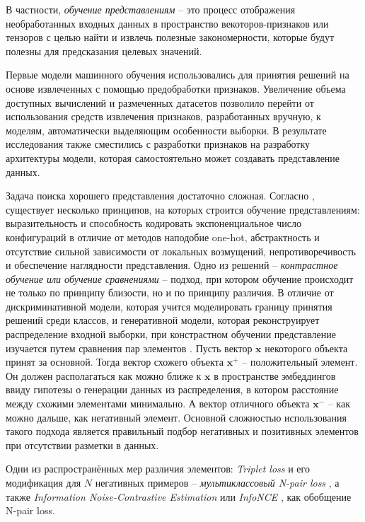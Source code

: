\documentclass[a4paper, 14pt]{article}
\begin{document}
В частности, \textit{обучение представлениям} -- это процесс отображения необработанных входных данных в пространство векоторов-признаков или тензоров с целью найти и извлечь полезные закономерности, которые будут полезны для предсказания целевых значений.

Первые модели машинного обучения использовались для принятия решений на основе извлеченных с помощью предобработки признаков. Увеличение объема доступных вычислений и размеченных датасетов позволило перейти от использования средств извлечения признаков, разработанных вручную, к моделям, автоматически выделяющим особенности выборки. В результате исследования также сместились с разработки признаков на разработку архитектуры модели, которая самостоятельно может создавать представление данных.

Задача поиска хорошего представления достаточно сложная. Согласно \citep{LeKhac2020}, существует несколько принципов, на которых строится обучение представлениям: выразительность и способность кодировать экспоненциальное число конфигураций в отличие от методов наподобие one-hot, абстрактность и отсутствие сильной зависимости от локальных возмущений, непротиворечивость и обеспечение наглядности представления. Одно из решений -- \textit{контрастное обучение или обучение сравнениями} -- подход, при котором обучение происходит не только по принципу близости, но и по принципу различия. В отличие от дискриминативной модели, которая учится моделировать границу принятия решений среди классов, и генеративной модели, которая реконструирует распределение входной выборки, при констрастном обучении представление изучается путем сравнения пар элементов \citep{Chopra}. Пусть вектор $\textbf{x}$ некоторого объекта принят за основной. Тогда вектор схожего объекта $\textbf{x}^+$ -- положительный элемент. Он должен располагаться как можно ближе к $\textbf{x}$ в пространстве эмбеддингов ввиду гипотезы о генерации данных из распределения, в котором расстояние между схожими элементами минимально. А вектор отличного объекта $\textbf{x}^-$ -- как можно дальше, как негативный элемент. Основной сложностью использования такого подхода является правильный подбор негативных и позитивных элементов при отсутствии разметки в данных.

Одни из распространённых мер различия элементов: \textit{Triplet loss} \citep{Schroff2015} и его модификация для $N$ негативных примеров -- \textit{мультиклассовый N-pair loss} \citep{Sohn2016ImprovedDM}, а также \textit{Information Noise-Contrastive Estimation} или \textit{InfoNCE} \citep{NCE}, \citep{Oord2018RepresentationLW} как обобщение N-pair loss.
\end{document}
